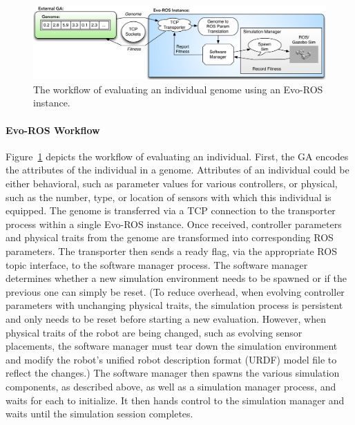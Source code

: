 \begin{figure}[!htb]
    \centering
\includegraphics[width=6.25in]{./Figures/Workflow.png}
\vspace{-0.075in}
\caption{The workflow of evaluating an individual genome using an Evo-ROS instance.}
\label{fig:workflow}
\vspace{-0.1in}
\end{figure}


\vspace{-0.1in}
\paragraph{Evo-ROS Workflow}
%
Figure~\ref{fig:workflow} depicts the workflow of evaluating an individual.
% 
First, the GA encodes the attributes of the individual in a genome.
Attributes of an individual could be either behavioral, such as parameter values for various controllers, or physical, such as the number, type, or location of sensors with which this individual is equipped. 
%
The genome is transferred via a TCP connection to the transporter process within a single Evo-ROS  instance. 
%
Once received, controller parameters and physical traits from the genome are 
transformed into corresponding ROS parameters.  
%
The transporter then sends a ready flag, via the appropriate ROS topic interface,
to the software manager process. 
%
The software manager determines whether a new simulation environment needs
to be spawned or if the previous one can simply be reset. 
%
(To reduce overhead, 
when evolving controller parameters with unchanging physical traits, the simulation process is persistent and only needs to
be reset before starting a new evaluation.
%
However, when physical traits of the robot are being changed,
such as evolving sensor placements, the software manager
must tear down the simulation environment and modify the robot's
unified robot description format (URDF) model file to reflect the
changes.)
%
The software manager then
spawns the various simulation components, as described above, as well as 
a simulation manager process, and waits for each to initialize.
%
It then hands control to the simulation manager and 
waits until the simulation session completes.

